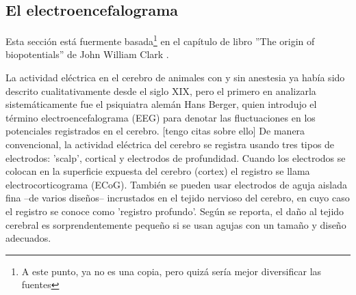 


\subsection{El electroencefalograma}

Esta secci\'on est\'a fuermente basada\footnote{A este punto, ya
no es una copia, pero quiz\'a ser\'ia mejor diversificar las fuentes} 
en el cap\'itulo de libro 
''The origin of biopotentials'' de John William Clark \cite{clark98}.


La actividad el\'ectrica en el cerebro de animales con y sin anestesia ya hab\'ia sido descrito
cualitativamente desde el siglo XIX, pero el primero en analizarla sistem\'aticamente fue el
psiquiatra alem\'an Hans Berger, quien introdujo el t\'ermino electroencefalograma (EEG) para
denotar las fluctuaciones en los potenciales registrados en el cerebro. [tengo citas sobre ello]
De manera convencional, la actividad el\'ectrica del cerebro se registra usando tres tipos de
electrodos: 'scalp', cortical y electrodos de profundidad.
Cuando los electrodos se colocan en la superficie expuesta del cerebro (cortex) el
registro se llama electrocorticograma (ECoG). Tambi\'en se pueden usar electrodos de aguja
aislada fina --de varios dise\~nos-- incrustados en el tejido nervioso del cerebro, en
cuyo caso el registro se conoce como 'registro profundo'. Seg\'un se reporta, el da\~no al
tejido cerebral es sorprendentemente peque\~no si se usan agujas con un tama\~no
y dise\~no adecuados.

